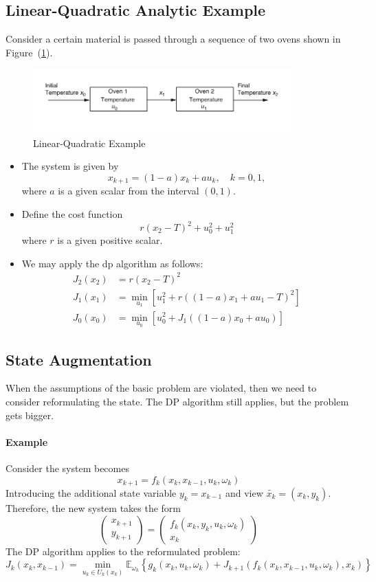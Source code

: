 \subsection{Linear-Quadratic Analytic Example}
Consider a certain material is passed through a sequence of two ovens shown in Figure~(\ref{fig:1:1:6}).
\begin{figure}
\centering
\includegraphics[width = 0.9\textwidth]{First_lecture/p_6}
\caption{Linear-Quadratic Example}
\label{fig:1:1:6}
\end{figure}
\begin{itemize}
\item
The system is given by
\[
x_{k+1} = (1-a)x_k + au_k,\quad k=0,1,
\]
where $a$ is a given scalar from the interval $(0,1)$.
\item
Define the cost function
\[
r(x_2-T)^2+u_0^2+u_1^2
\]
where $r$ is a given positive scalar.
\item
We may apply the dp algorithm as follows:
\begin{align*}
J_2(x_2)&=r(x_2-T)^2\\
J_1(x_1)&=\min_{u_1}\left[u_1^2+r((1-a)x_1 + au_1 - T)^2\right]\\
J_0(x_0)&=\min_{u_0}\left[u_0^2+J_1((1-a)x_0+au_0)\right]
\end{align*}
\end{itemize}


\subsection{State Augmentation}
When the assumptions of the basic problem are violated, then we need to consider reformulating the state. The DP algorithm still applies, but the problem gets bigger.
\paragraph{Example}
Consider the system becomes
\[
x_{k+1} = f_k(x_k,x_{k-1},u_k,\omega_k)
\]
Introducing the additional state variable $y_k = x_{k-1}$ and view $\tilde{x_k} = (x_k,y_k)$. Therefore, the new system takes the form
\[
\begin{pmatrix}
x_{k+1}\\y_{k+1}
\end{pmatrix}=\begin{pmatrix}
f_k(x_k,y_k,u_k,\omega_k)\\x_k
\end{pmatrix}
\]
The DP algorithm applies to the reformulated problem:
\[
J_k(x_k,x_{k-1})=\min_{u_k\in U_k(x_k)}\mathbb{E}_{\omega_k}
\left\{
g_k(x_k,u_k,\omega_k)
+
J_{k+1}(f_k(x_k,x_{k-1},u_k,\omega_k),x_k)
\right\}
\]

















